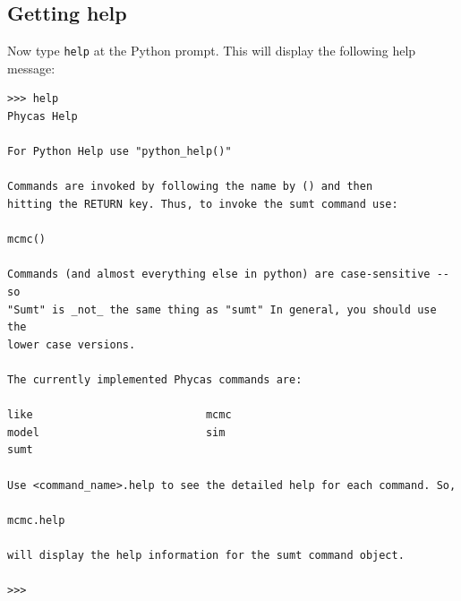 \documentclass[10pt]{article}
\newcommand{\cmd}[1]{{\tt \small #1}\index{#1}}	%
\begin{document}
\subsection{Getting help}
Now type \cmd{help} at the Python prompt. This will display the following help message:
\begin{verbatim}
>>> help
Phycas Help
    
For Python Help use "python_help()"

Commands are invoked by following the name by () and then
hitting the RETURN key. Thus, to invoke the sumt command use:

mcmc()

Commands (and almost everything else in python) are case-sensitive -- so
"Sumt" is _not_ the same thing as "sumt" In general, you should use the
lower case versions.

The currently implemented Phycas commands are:
  
like                           mcmc
model                          sim
sumt                           

Use <command_name>.help to see the detailed help for each command. So,

mcmc.help

will display the help information for the sumt command object.

>>> 
\end{verbatim}
\end{document}
